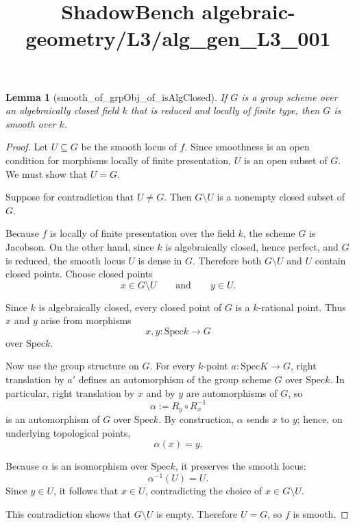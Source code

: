 \documentclass{article}
\title{ShadowBench algebraic-geometry/L3/alg\_gen\_L3\_001}
\newtheorem{lemma}{Lemma}
\begin{document}
\maketitle

\begin{lemma}[smooth_of_grpObj_of_isAlgClosed]
If $G$ is a group scheme over an algebraically closed field $k$ that is reduced and locally of finite type, then $G$ is smooth over $k$.
\end{lemma}

\begin{proof}
Let \(U \subseteq G\) be the smooth locus of \(f\). Since smoothness is an open condition for morphisms locally of finite presentation, \(U\) is an open subset of \(G\). We must show that \(U=G\).

Suppose for contradiction that \(U \neq G\). Then \(G \setminus U\) is a nonempty closed subset of \(G\).

Because \(f\) is locally of finite presentation over the field \(k\), the scheme \(G\) is Jacobson. On the other hand, since \(k\) is algebraically closed, hence perfect, and \(G\) is reduced, the smooth locus \(U\) is dense in \(G\). Therefore both \(G \setminus U\) and \(U\) contain closed points. Choose closed points
\[
x \in G \setminus U
\qquad\text{and}\qquad
y \in U.
\]

Since \(k\) is algebraically closed, every closed point of \(G\) is a \(k\)-rational point. Thus \(x\) and \(y\) arise from morphisms
\[
x,y : \mathrm{Spec} k \to G
\]
over \(\mathrm{Spec} k\).

Now use the group structure on \(G\). For every \(k\)-point \(a : \mathrm{Spec} K \to G\), right translation by \(a'\) defines an automorphism of the group scheme \(G\) over \(\mathrm{Spec} k\). In particular, right translation by \(x\) and by \(y\) are automorphisms of \(G\), so
\[
\alpha := R_{y} \circ R_{x}^{-1}
\]
is an automorphism of \(G\) over \(\mathrm{Spec} k\). By construction, \(\alpha\) sends \(x\) to \(y\); hence, on underlying topological points,
\[
\alpha(x)=y.
\]

Because \(\alpha\) is an isomorphism over \(\mathrm{Spec} k\), it preserves the smooth locus:
\[
\alpha^{-1}(U)=U.
\]
Since \(y\in U\), it follows that \(x \in U\), contradicting the choice of \(x \in G \setminus U\).

This contradiction shows that \(G \setminus U\) is empty. Therefore \(U=G\), so \(f\) is smooth.
\end{proof}
\end{document}
